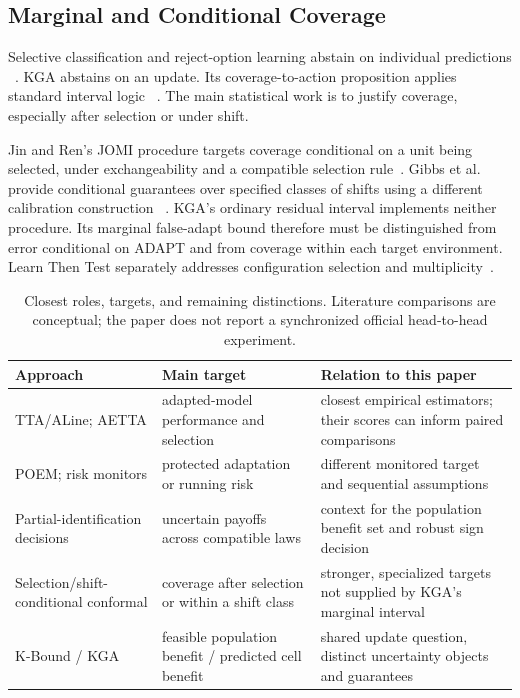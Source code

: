\subsection{Marginal and Conditional Coverage}

Selective classification and reject-option learning abstain on individual predictions
~\cite{geifman2017selective,chow1970reject,cortes2016boosting}. KGA abstains on an update.
Its coverage-to-action proposition applies standard interval logic
~\cite{tibshirani2019conformal,barber2023beyond,bates2021rcps,angelopoulos2025ltt}.
The main statistical work is to justify coverage, especially after selection or under shift.

Jin and Ren's JOMI procedure targets coverage conditional on a unit being selected, under
exchangeability and a compatible selection rule~\cite{jin2025selection}. Gibbs et al. provide
conditional guarantees over specified classes of shifts using a different calibration construction
~\cite{gibbs2025conditional}. KGA's ordinary residual interval implements neither procedure.
Its marginal false-adapt bound therefore must be distinguished from error conditional on ADAPT
and from coverage within each target environment. Learn Then Test separately addresses
configuration selection and multiplicity~\cite{angelopoulos2025ltt}.

\begin{table}[t]
\centering
\footnotesize
\caption{Closest roles, targets, and remaining distinctions. Literature comparisons are conceptual;
the paper does not report a synchronized official head-to-head experiment.}
\label{tab:related-comparison}
\begin{tabular}{@{}p{}p{}p{}@{}}
\toprule
Approach & Main target & Relation to this paper \\
\midrule
TTA/ALine; AETTA & adapted-model performance and selection & closest empirical estimators; their scores can inform paired comparisons \\
POEM; risk monitors & protected adaptation or running risk & different monitored target and sequential assumptions \\
Partial-identification decisions & uncertain payoffs across compatible laws & context for the population benefit set and robust sign decision \\
Selection/shift-conditional conformal & coverage after selection or within a shift class & stronger, specialized targets not supplied by KGA's marginal interval \\
K-Bound / KGA & feasible population benefit / predicted cell benefit & shared update question, distinct uncertainty objects and guarantees \\
\bottomrule
\end{tabular}
\end{table}

